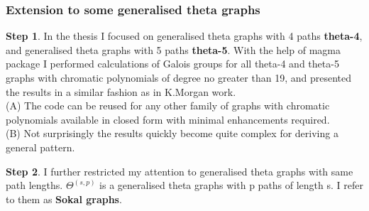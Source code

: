 \documentclass{beamer}
\begin{document}
\begin{frame}[shrink=20]
\frametitle{Extension to some generalised theta graphs}
\textbf{Step 1}. In the thesis I focused on generalised theta graphs with 4 paths \textbf{theta-4}, and generalised theta graphs with 5 paths \textbf{theta-5}. With the help of magma package I performed calculations of Galois groups for all theta-4 and theta-5 graphs with chromatic polynomials of degree no greater than 19, and presented the results in a similar fashion as in K.Morgan work. \\
(A) The code can be reused for any other family of graphs with chromatic polynomials available in closed form with minimal enhancements required.\\
(B) Not surprisingly the results quickly become quite complex for deriving a general pattern.

\textbf{Step 2}. I further restricted my attention to generalised theta graphs with same path lengths. \textbf{$\Theta^{(s,p)}$} is a generalised theta graphs with p paths of length s. I refer to them as \textbf{Sokal graphs}. 



\begin{columns}
\begin{column}{5cm}
\end{column}
\end{columns}
\end{frame}
\end{document}
